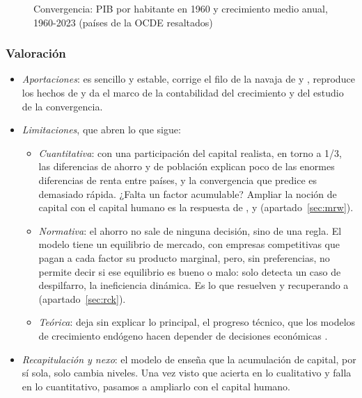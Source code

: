 \documentclass[11pt]{article}
\begin{document}
\begin{figure}[H]
\centering
\caption{Convergencia: PIB por habitante en 1960 y crecimiento medio anual, 1960-2023 (países de la OCDE resaltados)}\label{fig:convergencia}
\end{figure}

\subsubsection{Valoración}

\begin{itemize}
\item \emph{Aportaciones}: es sencillo y estable, corrige el filo de la navaja de  y , reproduce los hechos de  y da el marco de la contabilidad del crecimiento y del estudio de la convergencia.
\item \emph{Limitaciones}, que abren lo que sigue:
  \begin{itemize}
  \item \emph{Cuantitativa}: con una participación del capital realista, en torno a 1/3, las diferencias de ahorro y de población explican poco de las enormes diferencias de renta entre países, y la convergencia que predice es demasiado rápida. ¿Falta un factor acumulable? Ampliar la noción de capital con el capital humano es la respuesta de ,  y  (apartado~\ref{sec:mrw}).
  \item \emph{Normativa}: el ahorro no sale de ninguna decisión, sino de una regla. El modelo tiene un equilibrio de mercado, con empresas competitivas que pagan a cada factor su producto marginal, pero, sin preferencias, no permite decir si ese equilibrio es bueno o malo: solo detecta un caso de despilfarro, la ineficiencia dinámica. Es lo que resuelven \textcite{Cass1965} y \textcite{Koopmans1965} recuperando a  (apartado~\ref{sec:rck}).
  \item \emph{Teórica}: deja sin explicar lo principal, el progreso técnico, que los modelos de crecimiento endógeno hacen depender de decisiones económicas .
  \end{itemize}
\item \emph{Recapitulación y nexo}: el modelo de  enseña que la acumulación de capital, por sí sola, solo cambia niveles. Una vez visto que acierta en lo cualitativo y falla en lo cuantitativo, pasamos a ampliarlo con el capital humano.
\end{itemize}
\end{document}
